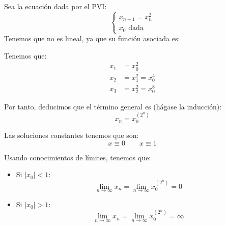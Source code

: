 \begin{ejemplo}
Sea la ecuación dada por el PVI:
    \begin{equation*}
    \left\{ \begin{array}{l}
        x_{n+1} = x_n^2 \\
        x_0 \text{ dada}
    \end{array}\right.
    \end{equation*}
    Tenemos que no es lineal, ya que su función asociada es:

    Tenemos que:
    \begin{align*}
        x_1 &= x_0^2\\
        x_2 &= x_1^2 = x_0^4\\
        x_3 &= x_2^2 = x_0^8
    \end{align*}

    Por tanto, deducimos que el término general es (hágase la inducción):
    \begin{equation*}
        x_n = x_0^{(2^n)}
    \end{equation*}

    Las soluciones constantes tenemos que son:
    \begin{equation*}
        x\equiv 0 \qquad x\equiv 1
    \end{equation*}
    
    Usando conocimientos de límites, tenemos que:
    \begin{itemize}
        \item Si $|x_0|<1$:
        \begin{equation*}
            \lim_{n\to \infty}x_n = \lim_{n\to \infty} x_0^{(2^n)} = 0
        \end{equation*}
        \item Si $|x_0|>1$:
        \begin{equation*}
            \lim_{n\to \infty}x_n = \lim_{n\to \infty} x_0^{(2^n)} = \infty
        \end{equation*}
    \end{itemize}    
\end{ejemplo}


